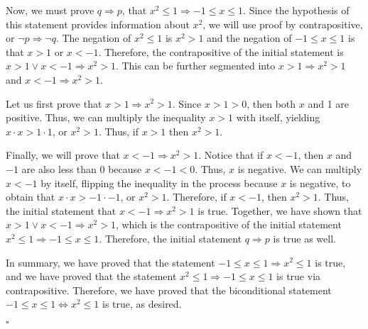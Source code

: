 \documentclass[12pt]{exam}
\begin{document}
\begin{questions}
\par
Now, we must prove $q \Rightarrow p$, that $x^2\leq1\Rightarrow -1\leq x\leq1$. Since the hypothesis of this statement provides information about $x^2$, we will use proof by contrapositive, or $\neg p \Rightarrow \neg q$. The negation of $x^2\leq1$ is $x^2>1$ and the negation of $-1\leq x\leq1$ is that $x>1$ or $ x<-1$. Therefore, the contrapositive of the initial statement is $x>1 \vee x<-1 \Rightarrow x^2>1$. This can be further segmented into $x>1\Rightarrow x^2>1$ and $x<-1 \Rightarrow x^2>1$.
\par
Let us first prove that $x>1\Rightarrow x^2>1$. Since $x>1>0$, then both $x$ and 1 are positive. Thus, we can multiply the inequality $x>1$ with itself, yielding $x \cdot x >1\cdot 1$, or $x^2>1$. Thus, if $x>1$ then $x^2>1$. 
\par
Finally, we will prove that $x<-1 \Rightarrow x^2>1$. Notice that if $x<-1$, then $x$ and $-1$ are also less than $0$ because $x<-1<0$. Thus, $x$ is negative. We can multiply $x<-1$ by itself, flipping the inequality in the process because $x$ is negative, to obtain that $x \cdot x > -1 \cdot -1$, or $x^2>1$. Therefore, if $x<-1$, then  $x^2>1$. Thus, the initial statement that $x<-1 \Rightarrow x^2>1$ is true. Together, we have shown that  $x>1 \vee x<-1 \Rightarrow x^2>1$, which is the contrapositive of the initial statement $x^2\leq1\Rightarrow -1\leq x\leq1$. Therefore, the initial statement $q \Rightarrow p$ is true as well.
\par
In summary, we have proved that the statement  $-1\leq x\leq1\Rightarrow x^2\leq1$ is true, and we have proved that the statement $x^2\leq1\Rightarrow -1\leq x\leq1$ is true via contrapositive. Therefore, we have proved that the biconditional statement $-1\leq x\leq1 \Leftrightarrow x^2\leq1$ is true, as desired.
\begin{flushright}
$\square$
\end{flushright}


\end{questions}
\end{document}
